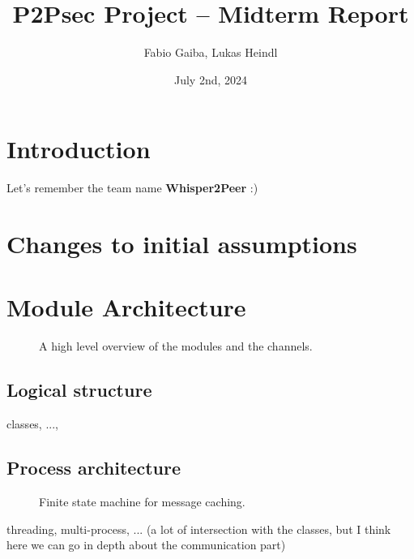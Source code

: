 \documentclass[a4paper,english,10pt,NET]{tumarticle}
\title{P2Psec Project -- Midterm Report}
\author{Fabio Gaiba, Lukas Heindl}
\date{July 2nd, 2024}
\begin{document}
\maketitle
\thispagestyle{tumarticle}

\section{Introduction}

Let's remember the team name \textbf{Whisper2Peer} :)

\section{Changes to initial assumptions}

\section{Module Architecture}

\begin{figure}
	\centering
	
	\caption{A high level overview of the modules and the channels.}
	\label{fig:overview}
\end{figure}

\subsection{Logical structure}

classes, ..., 

% 	

\subsection{Process architecture}

\begin{figure}
	\centering
	
	\caption{Finite state machine for message caching.}
	\label{fig:fsm_msgs}
\end{figure}

threading, multi-process, ... (a lot of intersection with the classes, but I think here we can go in depth about the communication part)

% 	
\end{document}
